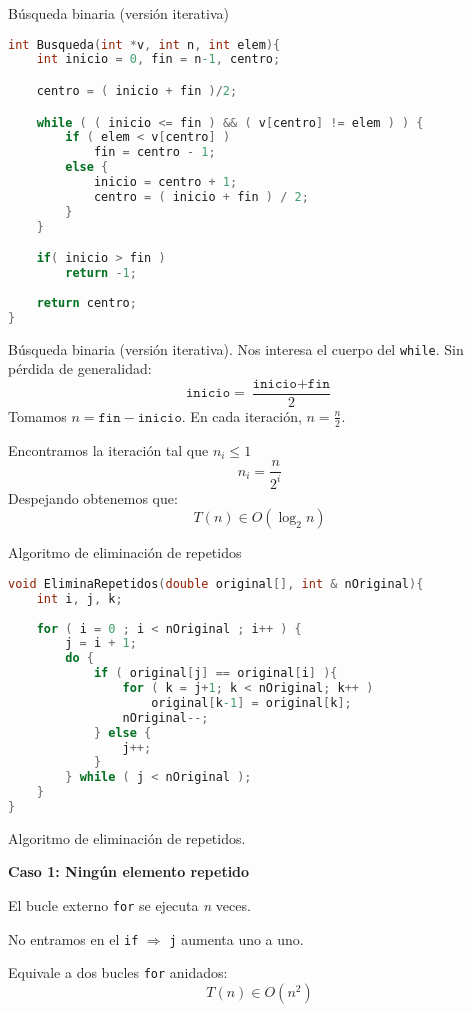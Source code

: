 \documentclass[10pt, xcolor=table]{beamer}
\begin{document}
\begin{frame}[fragile]{Búsqueda binaria (versión iterativa)}
\begin{lstlisting}[language=C]
int Busqueda(int *v, int n, int elem){
	int inicio = 0, fin = n-1, centro;

	centro = ( inicio + fin )/2;

	while ( ( inicio <= fin ) && ( v[centro] != elem ) ) {
		if ( elem < v[centro] ) 
			fin = centro - 1;
		else {
			inicio = centro + 1;
			centro = ( inicio + fin ) / 2;
		}
	}

	if( inicio > fin )
		return -1;
	
	return centro;
}
\end{lstlisting}
\end{frame}

\begin{frame}[fragile]{Búsqueda binaria (versión iterativa). 
}
Nos interesa el cuerpo del \texttt{while}. Sin pérdida de generalidad:
$$\texttt{inicio}=\frac{\texttt{inicio}+\texttt{fin}}{2}$$
Tomamos $n=\texttt{fin}-\texttt{inicio}$. En cada iteración, $n=\frac{n}{2}$.

Encontramos la iteración tal que $n_i \leq 1$ $$n_i = \frac{n}{2^i}$$ Despejando obtenemos que: $$T(n) \in O(\log_2{n})$$
\end{frame}



\begin{frame}[fragile]{Algoritmo de eliminación de repetidos}
\begin{lstlisting}[language=C]
void EliminaRepetidos(double original[], int & nOriginal){
	int i, j, k;
	
	for ( i = 0 ; i < nOriginal ; i++ ) {
		j = i + 1;
		do {
			if ( original[j] == original[i] ){
				for ( k = j+1; k < nOriginal; k++ )
					original[k-1] = original[k];
				nOriginal--;
			} else {
				j++;
			}
		} while ( j < nOriginal );
	}
}
\end{lstlisting}
\end{frame}

\begin{frame}[fragile]{Algoritmo de eliminación de repetidos. 
}
\begin{center}
\textbf{\large{Caso 1: Ningún elemento repetido}}
\end{center}

El bucle externo \texttt{for} se ejecuta \textit{n} veces.

No entramos en el \texttt{if} $\Rightarrow$ \texttt{j} aumenta uno a uno.

Equivale a dos bucles \texttt{for} anidados: $$T(n) \in O(n^2)$$

\end{frame}
\end{document}
